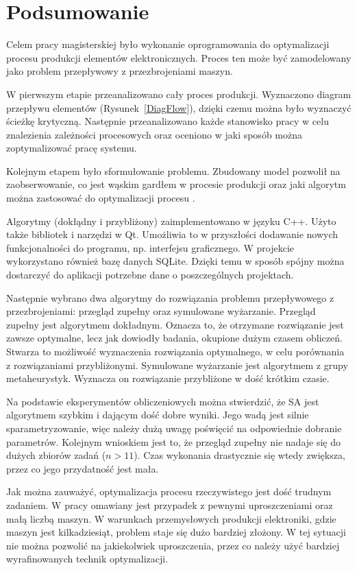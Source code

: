 \chapter{Podsumowanie}

Celem pracy magisterskiej było wykonanie oprogramowania do optymalizacji procesu produkcji elementów elektronicznych. Proces ten może być zamodelowany jako problem przepływowy z przezbrojeniami maszyn.

W pierwszym etapie przeanalizowano cały proces produkcji. Wyznaczono diagram przepływu elementów (Rysunek~\ref{DiagFlow}), dzięki czemu można było wyznaczyć ścieżkę krytyczną. Następnie przeanalizowano każde stanowisko pracy w celu znalezienia zależności procesowych oraz oceniono w jaki sposób można zoptymalizować pracę systemu.

Kolejnym etapem było sformułowanie problemu. Zbudowany model pozwolił na zaobserwowanie, co jest wąskim gardłem w procesie produkcji oraz jaki algorytm można zastosować do optymalizacji procesu .

Algorytmy (dokłądny i przybliżony) zaimplementowano w języku C++. Użyto także bibliotek i narzędzi w Qt. Umożliwia to w przyszłości dodawanie nowych funkcjonalności do programu, np. interfejsu graficznego. W projekcie wykorzystano również bazę danych SQLite. Dzięki temu w sposób spójny można dostarczyć do aplikacji potrzebne dane o poszczególnych projektach.

Następnie wybrano dwa algorytmy do rozwiązania problemu przepływowego z przezbrojeniami: przegląd zupełny oraz symulowane wyżarzanie. Przegląd zupełny jest algorytmem dokładnym. Oznacza to, że otrzymane rozwiązanie jest zawsze optymalne, lecz jak dowiodły badania, okupione dużym czasem obliczeń. Stwarza to możliwość wyznaczenia rozwiązania optymalnego, w celu porównania z rozwiązaniami przybliżonymi. Symulowane wyżarzanie jest algorytmem z grupy metaheurystyk. Wyznacza on rozwiązanie przybliżone w dość krótkim czasie.

Na podstawie eksperymentów obliczeniowych można stwierdzić, że SA jest algorytmem szybkim i dającym dość dobre wyniki. Jego wadą jest silnie sparametryzowanie, więc należy dużą uwagę poświęcić na odpowiednie dobranie parametrów. Kolejnym wnioskiem jest to, że przegląd zupełny nie nadaje się do dużych zbiorów zadań ($n>11$). Czas wykonania drastycznie się wtedy zwiększa, przez co jego przydatność jest mała.

Jak można zauważyć, optymalizacja procesu rzeczywistego jest dość trudnym zadaniem. W pracy omawiany jest przypadek z pewnymi uproszczeniami oraz małą liczbą maszyn. W warunkach przemysłowych produkcji elektroniki, gdzie maszyn jest kilkadziesiąt, problem staje się dużo bardziej złożony. W tej sytuacji nie można pozwolić na jakiekolwiek uproszczenia, przez co należy użyć bardziej wyrafinowanych technik optymalizacji.